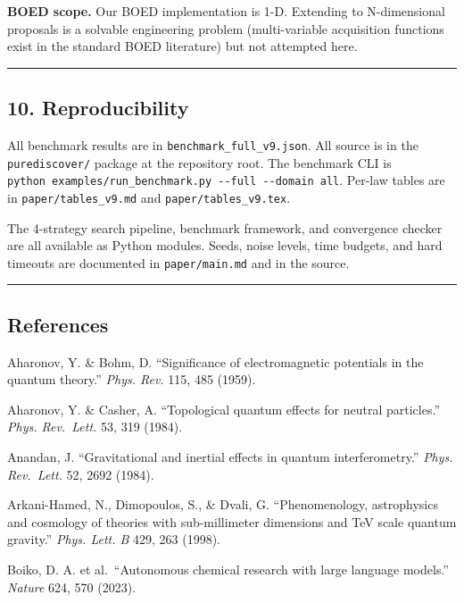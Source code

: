 \documentclass[
]{article}
\begin{document}
\textbf{BOED scope.} Our BOED implementation is 1-D. Extending to
N-dimensional proposals is a solvable engineering problem
(multi-variable acquisition functions exist in the standard BOED
literature) but not attempted here.

\begin{center}\rule{0.5\linewidth}{0.5pt}\end{center}

\subsection{10. Reproducibility}\label{reproducibility}

All benchmark results are in \texttt{benchmark\_full\_v9.json}. All
source is in the \texttt{purediscover/} package at the repository root.
The benchmark CLI is
\texttt{python\ examples/run\_benchmark.py\ -\/-full\ -\/-domain\ all}.
Per-law tables are in \texttt{paper/tables\_v9.md} and
\texttt{paper/tables\_v9.tex}.

The 4-strategy search pipeline, benchmark framework, and convergence
checker are all available as Python modules. Seeds, noise levels, time
budgets, and hard timeouts are documented in \texttt{paper/main.md} and
in the source.

\begin{center}\rule{0.5\linewidth}{0.5pt}\end{center}

\subsection{References}\label{references}

Aharonov, Y. \& Bohm, D. ``Significance of electromagnetic potentials in
the quantum theory.'' \emph{Phys. Rev.} 115, 485 (1959).

Aharonov, Y. \& Casher, A. ``Topological quantum effects for neutral
particles.'' \emph{Phys. Rev.~Lett.} 53, 319 (1984).

Anandan, J. ``Gravitational and inertial effects in quantum
interferometry.'' \emph{Phys. Rev.~Lett.} 52, 2692 (1984).

Arkani-Hamed, N., Dimopoulos, S., \& Dvali, G. ``Phenomenology,
astrophysics and cosmology of theories with sub-millimeter dimensions
and TeV scale quantum gravity.'' \emph{Phys. Lett. B} 429, 263 (1998).

Boiko, D. A. et al.~``Autonomous chemical research with large language
models.'' \emph{Nature} 624, 570 (2023).
\end{document}
